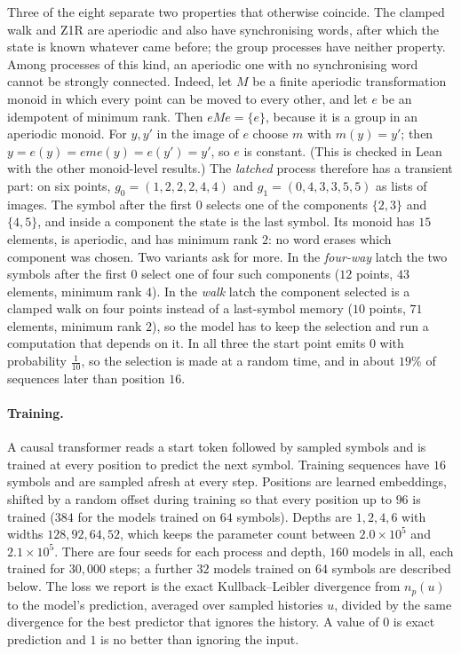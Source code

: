 \documentclass[10pt]{article}
\theoremstyle{definition}
\theoremstyle{remark}
\begin{document}
Three of the eight separate two properties that otherwise coincide.  The
clamped walk and Z1R are aperiodic and also have synchronising words,
after which the state is known whatever came before; the group
processes have neither property.  Among processes of this kind, an
aperiodic one with no synchronising word cannot be strongly
connected.  Indeed, let $M$ be
a finite aperiodic transformation monoid in which every point can be
moved to every other, and let $e$ be an idempotent of minimum rank.
Then $eMe=\{e\}$, because it is a group in an aperiodic monoid.  For
$y,y'$ in the image of $e$ choose $m$ with $m(y)=y'$; then
$y=e(y)=eme(y)=e(y')=y'$, so $e$ is constant.  (This is checked in
Lean with the other monoid-level results.)  The \emph{latched}
process therefore has a transient part: on six points,
$g_0=(1,2,2,2,4,4)$ and $g_1=(0,4,3,3,5,5)$ as lists of images.  The
symbol after the first $0$ selects one of the components $\{2,3\}$
and $\{4,5\}$, and inside a component the state is the last symbol.
Its monoid has $15$ elements, is aperiodic, and has minimum rank $2$:
no word erases which component was chosen.  Two variants ask for
more.  In the \emph{four-way} latch the two symbols after the first
$0$ select one of four such components ($12$ points, $43$ elements,
minimum rank $4$).  In the \emph{walk} latch the component selected
is a clamped walk on four points instead of a last-symbol memory
($10$ points, $71$ elements, minimum rank $2$), so the model has to
keep the selection and run a computation that depends on it.  In all
three the start point emits $0$ with probability $\tfrac1{10}$, so
the selection is made at a random time, and in about $19\%$ of
sequences later than position $16$.

\paragraph{Training.}
A causal transformer reads a start token followed by sampled symbols
and is trained at every position to predict the next symbol.
Training sequences have $16$ symbols and are sampled afresh at every
step.  Positions are learned embeddings, shifted by a random offset
during training so that every position up to $96$ is trained ($384$
for the models trained on $64$ symbols).  Depths
are $1,2,4,6$ with widths $128,92,64,52$, which keeps the parameter
count between $2.0\times10^5$ and $2.1\times10^5$.  There are four
seeds for each process and depth, $160$ models in all, each trained
for $30{,}000$ steps; a further $32$ models trained on $64$ symbols
are described below.  The loss we report is the exact
Kullback--Leibler divergence from $n_p(u)$ to the model's prediction,
averaged over sampled histories $u$, divided by the same divergence
for the best predictor that ignores the history.  A value of $0$ is
exact prediction and $1$ is no better than ignoring the input.
\end{document}
